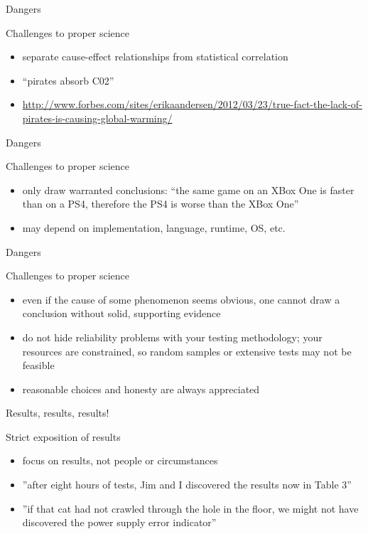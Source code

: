 \documentclass{beamer}
\begin{document}
\begin{frame}{Dangers}
\begin{block}{Challenges to proper science}
\begin{itemize}
\item separate cause-effect relationships from statistical correlation
\item ``pirates absorb C02''
\item \url{http://www.forbes.com/sites/erikaandersen/2012/03/23/true-fact-the-lack-of-pirates-is-causing-global-warming/}
\end{itemize}
\end{block}
\end{frame}


\begin{frame}{Dangers}
\begin{block}{Challenges to proper science}
\begin{itemize}
\item only draw warranted conclusions: ``the same game on an XBox One is faster than on a PS4, therefore the PS4 is worse than the XBox One''
\item may depend on implementation, language, runtime, OS, etc.
\end{itemize}
\end{block}
\end{frame}


\begin{frame}{Dangers}
\begin{block}{Challenges to proper science}
\begin{itemize}
\item even if the cause of some phenomenon seems obvious, one cannot draw a conclusion without solid, supporting evidence
\item do not hide reliability problems with your testing methodology; your resources are constrained, so random samples or extensive tests may not be feasible
\item reasonable choices and honesty are always appreciated
\end{itemize}
\end{block}
\end{frame}

\begin{frame}{Results, results, results!}
\begin{block}{Strict exposition of results}
\begin{itemize}
\item focus on results, not people or circumstances
\item ''after eight hours of tests, Jim and I discovered the results now in Table 3''
\item ''if that cat had not crawled through the hole in the floor, we might not have discovered the power supply error indicator''
\end{itemize}
\end{block}
\end{frame}
\end{document}
